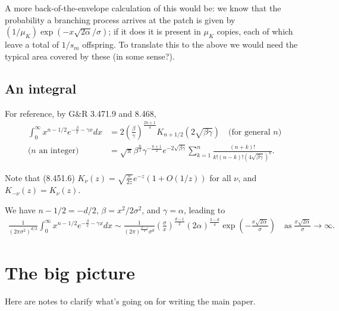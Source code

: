 \documentclass{article}
\begin{document}
A more back-of-the-envelope calculation of this would be:
we know that the probability a branching process arrives at the patch is given by $(1/\mu_K)\exp(-x\sqrt{2 \alpha}/\sigma)$;
if it does it is present in $\mu_K$ copies, each of which leave a total of $1/s_m$ offspring.
To translate this to the above we would need the typical area covered by these (in some sense?).

\subsection{An integral}

For reference, by G\&R 3.471.9 and 8.468,
\begin{align}
  \int_0^\infty x^{n-1/2} e^{-\frac{\beta}{x}-\gamma x} dx &= 2 \left( \frac{\beta}{\gamma} \right)^{\frac{2n+1}{4}} K_{n+1/2}(2\sqrt{\beta\gamma}) \quad \mbox{(for general $n$)} \\
  \mbox{($n$ an integer)} \quad &= \sqrt{\pi} \beta^{\frac{n}{2}} \gamma^{-\frac{n+1}{2}} e^{-2\sqrt{\beta\gamma}} \sum_{k=1}^n \frac{ (n+k)! }{ k! (n-k)! (4\sqrt{\beta \gamma})^k } .
\end{align}

Note that (8.451.6) $K_\nu(z) = \sqrt{\frac{\pi}{2z}} e^{-z} (1 + O(1/z))$ for all $\nu$, and $K_{-\nu}(z)=K_\nu(z)$.

We have $n-1/2 = - d/2$, $\beta=x^2/2\sigma^2$, and $\gamma = \alpha$, leading to
\begin{align}
\frac{1}{(2\pi\sigma^2 )^{d/2}} \int_0^\infty x^{n-1/2} e^{-\frac{\beta}{x}-\gamma x} dx \sim
\frac{ 1 }{ (2\pi)^\frac{d-1}{2} \sigma^d } \left( \frac{\sigma}{x} \right)^{\frac{d-1}{2}} ({2\alpha})^\frac{3-d}{4} \exp\left( - \frac{ x \sqrt{2 \alpha} }{ \sigma } \right) \quad \mbox{as}\; \frac{x\sqrt{2\alpha}}{\sigma} \to \infty .
\end{align}

\section{The big picture}

Here are notes to clarify what's going on for writing the main paper.
\end{document}
